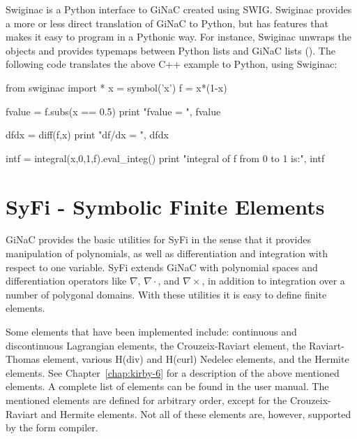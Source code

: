 Swiginac is a Python interface to GiNaC created using SWIG.  Swiginac
provides a more or less direct translation of GiNaC to Python, but has
features that makes it easy to program in a Pythonic way.  For instance,
Swiginac unwraps the  objects and provides typemaps between
Python lists and GiNaC lists ().  The following code translates
the above C++ example to Python, using Swiginac:
\begin{python}
from swiginac import *
x = symbol('x')
f = x*(1-x)

fvalue = f.subs(x == 0.5)
print "fvalue = ", fvalue

dfdx = diff(f,x)
print "df/dx = ", dfdx

intf = integral(x,0,1,f).eval_integ()
print "integral of f from 0 to 1 is:", intf
\end{python}

\section{SyFi - Symbolic Finite Elements}

GiNaC provides the basic utilities for SyFi in the sense that it provides
manipulation of polynomials, as well as differentiation and integration
with respect to one variable. SyFi extends GiNaC with polynomial
spaces and differentiation operators like $\nabla$, $\nabla\cdot$, and
$\nabla\times$, in addition to integration over a number of polygonal
domains.  With these utilities it is easy to define finite elements.

Some elements that have been implemented include: continuous and
discontinuous Lagrangian elements, the Crouzeix-Raviart element, the
Raviart-Thomas element, various H(div) and H(curl) Nedelec elements, and
the Hermite elements. See Chapter~\ref{chap:kirby-6} for a description of
the above mentioned elements.  A complete list of elements can be found in
the user manual. The mentioned elements are defined for arbitrary order,
except for the Crouzeix-Raviart and Hermite elements. Not all of these
elements are, however, supported by the form compiler.

